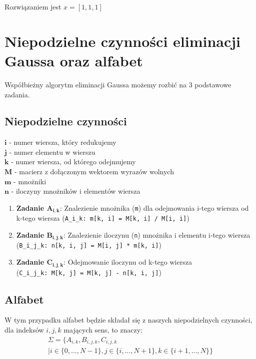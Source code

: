 \documentclass{article}
\begin{document}
Rozwiązaniem jest $x = [1, 1, 1]$

\newpage

\section{Niepodzielne czynności eliminacji Gaussa oraz alfabet}
Współbieżny algorytm eliminacji Gaussa możemy rozbić na 3 podstawowe zadania.
\subsection{Niepodzielne czynności}
$\mathbf{i}$ - numer wiersza, który redukujemy \\
$\mathbf{j}$ - numer elementu w wierszu \\
$\mathbf{k}$ - numer wiersza, od którego odejmujemy \\
$\mathbf{M}$ - macierz z dołączonym wektorem wyrazów wolnych \\
$\mathbf{m}$ - mnożniki \\
$\mathbf{n}$ - iloczyny mnożników i elementów wiersza 
\begin{enumerate}
    \item \textbf{Zadanie $\mathbf{A_{i,k}}$}: Znalezienie mnożnika (\verb|m|) dla odejmowania i-tego wiersza od k-tego wiersza 
    (\verb|A_i_k: m[k, i] = M[k, i] / M[i, i]|)
    \item \textbf{Zadanie $\mathbf{B_{i,j,k}}$}: Znalezienie iloczynu (\verb|n|) mnożnika i elementu i-tego wiersza 
    (\verb|B_i_j_k: n[k, i, j] = M[i, j] * m[k, i]|)
    \item \textbf{Zadanie $\mathbf{C_{i,j,k}}$}: Odejmowanie iloczynu od k-tego wiersza \\
    (\verb|C_i_j_k: M[k, j] = M[k, j] - n[k, i, j]|)
\end{enumerate}

\subsection{Alfabet}
W tym przypadku alfabet będzie składał się z naszych niepodzielnych czynności, 
dla indeksów $i, j, k$ mających sens, to znaczy:
\begin{multline}
    \Sigma = \{A_{i,k}, B_{i,j,k}, C_{i,j,k} \\
    \mid i \in \{0, \ldots, N-1\}, j \in \{i, \ldots, N+1\}, k \in \{i+1, \ldots, N\}\}
\end{multline}
\end{document}
